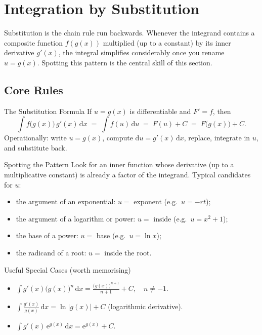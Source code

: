 \chapter{Integration by Substitution}

Substitution is the chain rule
run backwards. Whenever the integrand contains a composite function
$f(g(x))$ multiplied (up to a constant) by its inner derivative $g'(x)$,
the integral simplifies considerably once you rename $u=g(x)$. Spotting
this pattern is the central skill of this section.

\section{Core Rules}

\begin{rulebox}{The Substitution Formula}
If $u=g(x)$ is differentiable and $F'=f$, then
\[
  \int f\bigl(g(x)\bigr)\,g'(x)\,\mathrm{d}x
    \;=\; \int f(u)\,\mathrm{d}u \;=\; F(u)+C \;=\; F\bigl(g(x)\bigr)+C .
\]
Operationally: write $u=g(x)$, compute $\mathrm{d}u=g'(x)\,\mathrm{d}x$,
replace, integrate in $u$, and substitute back.
\end{rulebox}

\begin{rulebox}{Spotting the Pattern}
Look for an inner function whose derivative (up to a multiplicative
constant) is already a factor of the integrand. Typical candidates for
$u$:
\begin{itemize}[leftmargin=1.6em,itemsep=0.3ex]
  \item the argument of an exponential: $u=$ exponent (e.g.\ $u=-rt$);
  \item the argument of a logarithm or power: $u=$ inside (e.g.\
        $u=x^{2}+1$);
  \item the base of a power: $u=$ base (e.g.\ $u=\ln x$);
  \item the radicand of a root: $u=$ inside the root.
\end{itemize}
\end{rulebox}

\begin{rulebox}{Useful Special Cases (worth memorising)}
\begin{itemize}[leftmargin=1.6em,itemsep=0.3ex]
  \item $\displaystyle\int g'(x)\bigl(g(x)\bigr)^{n}\,\mathrm{d}x
        = \frac{\bigl(g(x)\bigr)^{n+1}}{n+1}+C,\quad n\neq -1$.
  \item $\displaystyle\int \frac{g'(x)}{g(x)}\,\mathrm{d}x
        = \ln|g(x)|+C$ (logarithmic derivative).
  \item $\displaystyle\int g'(x)\,\mathrm{e}^{g(x)}\,\mathrm{d}x
        = \mathrm{e}^{g(x)}+C$.
\end{itemize}
\end{rulebox}

